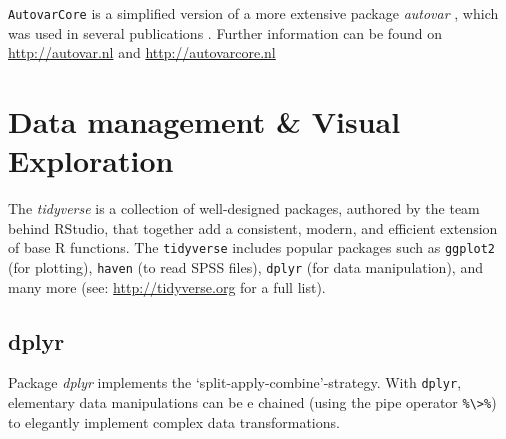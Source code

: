 \documentclass[]{book}
\newenvironment{Shaded}{\begin{snugshade}}{\end{snugshade}}
\newcommand{\KeywordTok}[1]{\textcolor[rgb]{0.13,0.29,0.53}{\textbf{#1}}}
\newcommand{\DataTypeTok}[1]{\textcolor[rgb]{0.13,0.29,0.53}{#1}}
\newcommand{\DecValTok}[1]{\textcolor[rgb]{0.00,0.00,0.81}{#1}}
\newcommand{\StringTok}[1]{\textcolor[rgb]{0.31,0.60,0.02}{#1}}
\newcommand{\CommentTok}[1]{\textcolor[rgb]{0.56,0.35,0.01}{\textit{#1}}}
\newcommand{\OperatorTok}[1]{\textcolor[rgb]{0.81,0.36,0.00}{\textbf{#1}}}
\newcommand{\NormalTok}[1]{#1}
\begin{document}
\texttt{AutovarCore} is a simplified version of a more extensive package
\emph{autovar} \citep{R-autovarCore}, which was used in several
publications \citep{VanderKrieke2015, Emerencia2016}. Further
information can be found on
\href{https://autovar.nl/}{http://autovar.nl} and
\href{https://autovarcore.nl/}{http://autovarcore.nl}

\section{Data management \& Visual
Exploration}\label{data-management-visual-exploration}


The \emph{tidyverse} is a collection of well-designed packages, authored
by the team behind RStudio, that together add a consistent, modern, and
efficient extension of base R functions. The \texttt{tidyverse} includes
popular packages such as \texttt{ggplot2} (for plotting), \texttt{haven}
(to read SPSS files), \texttt{dplyr} (for data manipulation), and many
more (see: \url{http://tidyverse.org} for a full list).

\subsection{dplyr}\label{dplyr}


Package \emph{dplyr} \citep{R-dplyr} implements the
`split-apply-combine'-strategy. With \texttt{dplyr}, elementary data
manipulations can be e chained (using the pipe operator
\texttt{\%\textbackslash{}\textgreater{}\%}) to elegantly implement
complex data transformations.

\begin{Shaded}
\end{Shaded}
\end{document}
